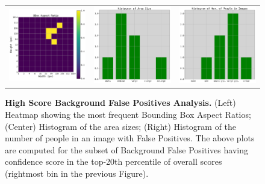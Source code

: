 \documentclass[10pt,onecolumn,letterpaper]{article}
\begin{document}
\begin{figure}[h!]
\centering
\begin{tabular}{ccc}
\includegraphics[width=.2\linewidth]{./result/rmpe/background_errors/false_positives/bckd_false_pos_bbox_aspect_ratio_3.pdf} &
\includegraphics[width=.2\linewidth]{./result/rmpe/background_errors/false_positives/bckd_false_pos_area_histogram.pdf} &
\includegraphics[width=.2\linewidth]{./result/rmpe/background_errors/false_positives/bckd_false_pos_num_people_histogram.pdf}\\
\end{tabular}
\vspace{-2mm}
\caption{ {\small \textbf{High Score Background False Positives Analysis.} (Left) Heatmap showing the most frequent Bounding Box Aspect Ratios;
(Center) Histogram of the area sizes; (Right) Histogram of the number of people in an image with False Positives.
The above plots are computed for the subset of Background False Positives having confidence score in the top-20th percentile of overall scores
(rightmost bin in the previous Figure).}}
\end{figure}
\end{document}
